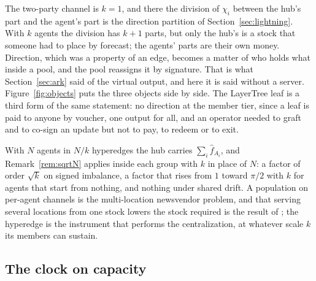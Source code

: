 \documentclass[11pt]{article}
\theoremstyle{plain}
\theoremstyle{definition}
\theoremstyle{remark}
\begin{document}
The two-party channel is $k=1$, and there the division of $\chi_i$ between the hub's part and the agent's part is the direction partition of Section~\ref{sec:lightning}. With $k$ agents the division has $k+1$ parts, but only the hub's is a stock that someone had to place by forecast; the agents' parts are their own money. Direction, which was a property of an edge, becomes a matter of who holds what inside a pool, and the pool reassigns it by signature. That is what Section~\ref{sec:ark} said of the virtual output, and here it is said without a server. Figure~\ref{fig:objects} puts the three objects side by side. The LayerTree leaf is a third form of the same statement: no direction at the member tier, since a leaf is paid to anyone by voucher, one output for all, and an operator needed to graft and to co-sign an update but not to pay, to redeem or to exit.



With $N$ agents in $N/k$ hyperedges the hub carries $\sum_i\hat f_{A_i}$, and Remark~\ref{rem:sqrtN} applies inside each group with $k$ in place of $N$: a factor of order $\sqrt k$ on signed imbalance, a factor that rises from $1$ toward $\pi/2$ with $k$ for agents that start from nothing, and nothing under shared drift. A population on per-agent channels is the multi-location newsvendor problem, and that serving several locations from one stock lowers the stock required is the result of \citet{eppen1979centralization}; the hyperedge is the instrument that performs the centralization, at whatever scale $k$ its members can sustain.

\subsection{The clock on capacity}
\end{document}
